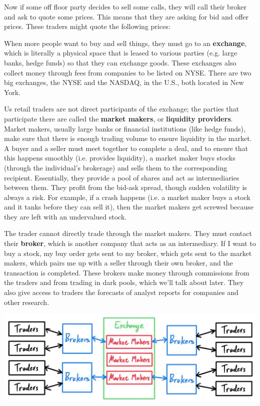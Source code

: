 \documentclass{article}
\begin{document}
    Now if some off floor party decides to sell some calls, they will call their broker and ask to quote some prices. This means that they are asking for bid and offer prices. These traders might quote the following prices: 

    When more people want to buy and sell things, they must go to an \textbf{exchange}, which is literally a physical space that is leased to various parties (e.g. large banks, hedge funds) so that they can exchange goods. These exchanges also collect money through fees from companies to be listed on NYSE. There are two big exchanges, the NYSE and the NASDAQ, in the U.S., both located in New York. 

    Us retail traders are not direct participants of the exchange; the parties that participate there are called the \textbf{market makers}, or \textbf{liquidity providers}. Market makers, usually large banks or financial institutions (like hedge funds), make sure that there is enough trading volume to ensure liquidity in the market. A buyer and a seller must meet together to complete a deal, and to ensure that this happens smoothly (i.e. provides liquidity), a market maker buys stocks (through the individual's brokerage) and sells them to the corresponding recipient. Essentially, they provide a pool of shares and act as intermediaries between them. They profit from the bid-ask spread, though sudden volatility is always a risk. For example, if a crash happens (i.e. a market maker buys a stock and it tanks before they can sell it), then the market makers get screwed because they are left with an undervalued stock. 

    The trader cannot directly trade through the market makers. They must contact their \textbf{broker}, which is another company that acts as an intermediary. If I want to buy a stock, my buy order gets sent to my broker, which gets sent to the market makers, which pairs me up with a seller through their own broker, and the transaction is completed. These brokers make money through commissions from the traders and from trading in dark pools, which we'll talk about later. They also give access to traders the forecasts of analyst reports for companies and other research. 

    \begin{center}
      \includegraphics[scale=0.3]{img/exchange.jpg}
    \end{center}
\end{document}
